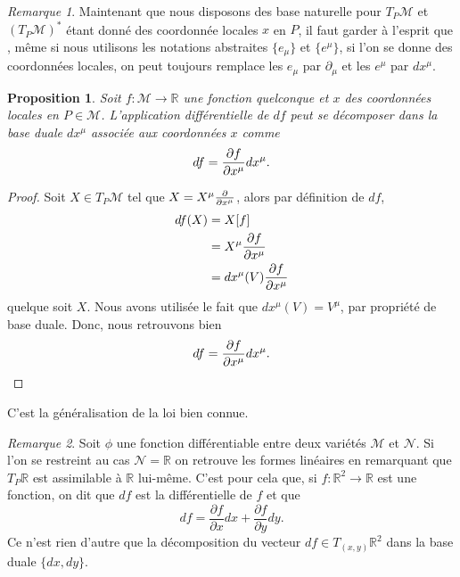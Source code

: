 \documentclass[a4paper,11pt]{report}
\theoremstyle{definition}
\theoremstyle{plain}
\newtheorem{prop}[thm]{Proposition}
\theoremstyle{definition}
\theoremstyle{remark}
\newtheorem{rmk}{Remarque}[chapter]
\newcommand{\M}{\mathscr{M}}
\newcommand{\N}{\mathscr{N}}
\newcommand{\p}{\partial}
\begin{document}
                
                \begin{rmk}
                    Maintenant que nous disposons des base naturelle pour $T_P\M$ et $(T_P\M)^*$ étant donné des coordonnée locales $x$ en $P$, il faut garder à l'esprit que , même si nous utilisons les notations abstraites $\{e_\mu\}$ et $\{e^\mu\}$, si l'on se donne des coordonnées locales, on peut toujours remplace les $e_\mu$ par $\p_\mu$ et les $e^\mu$ par $dx^\mu$.
                \end{rmk}
                
                \begin{prop}
                    Soit $f:\M\to\mathbb{R}$ une fonction quelconque et $x$ des coordonnées locales en $P\in\M$. L'application différentielle de $df$ peut se décomposer dans la base duale $dx^\mu$ associée aux coordonnées $x$ comme
                    \begin{equation}
                        df = \pdv{f}{x^\mu}dx^\mu.
                    \end{equation}
                \end{prop}
                
                \begin{proof}
                    Soit $X\in T_P\M$ tel que $X = X^\mu\pdv{}{x^\mu}$, alors par définition de $df$,
                    \begin{align}
                        df(X) &= X[f]\\
                        &= X^\mu\pdv{f}{x^\mu}\\
                        &= dx^\mu(V)\pdv{f}{x^\mu}
                    \end{align}
                    quelque soit $X$. Nous avons utilisée le fait que $dx^\mu(V) = V^\mu$, par propriété de base duale. Donc, nous retrouvons bien
                    \begin{equation}
                        df = \pdv{f}{x^\mu}dx^\mu.
                    \end{equation}
                \end{proof}
                
                C'est la généralisation de la loi bien connue.
                
                \begin{rmk}
                    Soit $\phi$ une fonction différentiable entre deux variétés $\M$ et $\N$. Si l'on se restreint au cas $\N=\mathbb{R}$ on retrouve les formes linéaires en remarquant que $T_P\mathbb{R}$ est assimilable à $\mathbb{R}$ lui-même. C'est pour cela que, si $f:\mathbb{R}^2\to\mathbb{R}$ est une fonction, on dit que $df$ est la différentielle de $f$ et que
                    \begin{equation}
                        df = \frac{\p f}{\p x} dx + \frac{\p f}{\p y} dy.
                    \end{equation}
                    Ce n'est rien d'autre que la décomposition du vecteur $df\in T_{(x,y)}\mathbb{R}^2$ dans la base duale $\{dx,dy\}$.
                \end{rmk}
                
\end{document}
